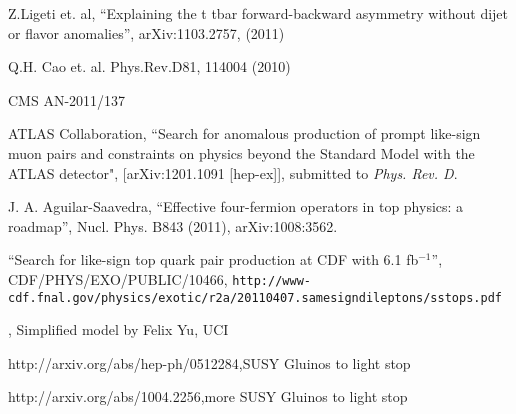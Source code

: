 \begin{thebibliography}{99}
 {Z.Ligeti et. al, ``Explaining the t tbar forward-backward asymmetry without dijet or flavor anomalies'', arXiv:1103.2757, (2011)}



 {Q.H. Cao et. al. Phys.Rev.D81, 114004 (2010)}

 {CMS AN-2011/137}

 ATLAS Collaboration, 
``Search for anomalous production of prompt like-sign muon 
pairs and constraints on physics beyond the Standard Model
with the ATLAS detector",   [arXiv:1201.1091 [hep-ex]], submitted to 
\textit{Phys. Rev. D}.

 {J. A. Aguilar-Saavedra, 
 ``Effective four-fermion operators in top physics: a roadmap'', 
 Nucl. Phys. B843 (2011), arXiv:1008:3562.}

 {``Search for like-sign top quark pair production at CDF with 6.1 fb$^{-1}$''}, CDF/PHYS/EXO/PUBLIC/10466, 
{\tt http://www-cdf.fnal.gov/physics/exotic/r2a/20110407.samesigndileptons/sstops.pdf}

,{ Simplified model by Felix Yu, UCI}

 { http://arxiv.org/abs/hep-ph/0512284},{SUSY Gluinos to light stop}

 { http://arxiv.org/abs/1004.2256},{more SUSY Gluinos to light stop}






\end{thebibliography}







